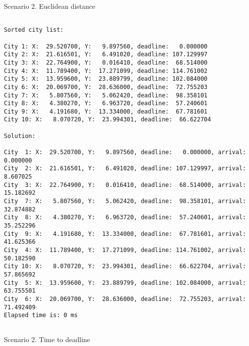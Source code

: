 \documentclass[a4paper, 12pt]{article}
\begin{document}
Scenario 2. Euclidean distance

\begin{lstlisting}

Sorted city list:

City 1: X:  29.520700, Y:   9.897560, deadline:   0.000000
City 2: X:  21.616501, Y:   6.491020, deadline: 107.129997
City 3: X:  22.764900, Y:   0.016410, deadline:  68.514000
City 4: X:  11.789400, Y:  17.271099, deadline: 114.761002
City 5: X:  13.959600, Y:  23.889799, deadline: 102.084000
City 6: X:  20.069700, Y:  28.636000, deadline:  72.755203
City 7: X:   5.807560, Y:   5.062420, deadline:  98.358101
City 8: X:   4.380270, Y:   6.963720, deadline:  57.240601
City 9: X:   4.191680, Y:  13.334000, deadline:  67.781601
City 10: X:   8.070720, Y:  23.994301, deadline:  66.622704

Solution: 

City  1: X:  29.520700, Y:   9.897560, deadline:   0.000000, arrival:   0.000000
City  2: X:  21.616501, Y:   6.491020, deadline: 107.129997, arrival:   8.607025
City  3: X:  22.764900, Y:   0.016410, deadline:  68.514000, arrival:  15.182692
City  7: X:   5.807560, Y:   5.062420, deadline:  98.358101, arrival:  32.874882
City  8: X:   4.380270, Y:   6.963720, deadline:  57.240601, arrival:  35.252296
City  9: X:   4.191680, Y:  13.334000, deadline:  67.781601, arrival:  41.625366
City  4: X:  11.789400, Y:  17.271099, deadline: 114.761002, arrival:  50.182590
City 10: X:   8.070720, Y:  23.994301, deadline:  66.622704, arrival:  57.865692
City  5: X:  13.959600, Y:  23.889799, deadline: 102.084000, arrival:  63.755501
City  6: X:  20.069700, Y:  28.636000, deadline:  72.755203, arrival:  71.492409
Elapsed time is: 0 ms


\end{lstlisting}

Scenario 2. Time to deadline
\end{document}
